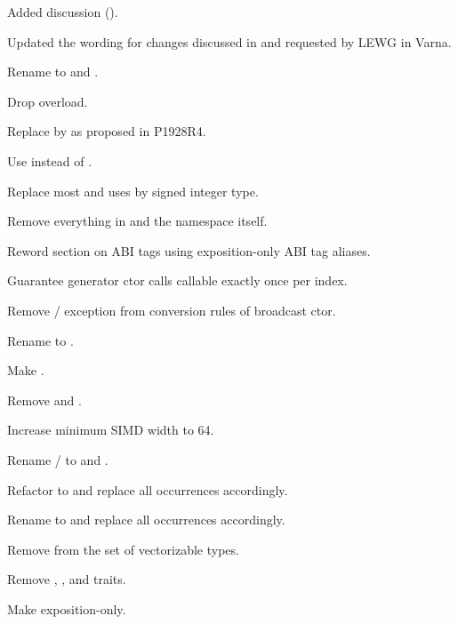 \begin{revision}
\item Added  discussion ().
\end{revision}

\begin{revision}
\item Updated the wording for changes discussed in and requested by LEWG in Varna.
\item Rename to  and .
\item Drop  overload.
\item Replace  by  as proposed in P1928R4.
\item Use  instead of .
\item Replace most  and  uses by  signed integer type.
\item Remove everything in  and the namespace itself.
\item Reword section on ABI tags using exposition-only ABI tag aliases.
\item Guarantee generator ctor calls callable exactly once per index.
\item Remove / exception from conversion rules of broadcast ctor.
\item Rename  to .
\item Make  .
\item Remove  and .
\item Increase minimum SIMD width to 64.
\item Rename / to  and .
\item Refactor  to  and replace all occurrences accordingly.
\item Rename  to  and replace all occurrences accordingly.
\item Remove  from the set of vectorizable types.
\item Remove , , and  traits.
\item Make  exposition-only.
\end{revision}

